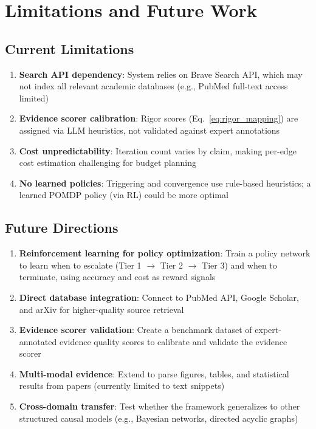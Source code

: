 \section{Limitations and Future Work}

\subsection{Current Limitations}

\begin{enumerate}
    \item \textbf{Search API dependency}: System relies on Brave Search API, which may not index all relevant academic databases (e.g., PubMed full-text access limited)
    
    \item \textbf{Evidence scorer calibration}: Rigor scores (Eq.~\ref{eq:rigor_mapping}) are assigned via LLM heuristics, not validated against expert annotations
    
    \item \textbf{Cost unpredictability}: Iteration count varies by claim, making per-edge cost estimation challenging for budget planning
    
    \item \textbf{No learned policies}: Triggering and convergence use rule-based heuristics; a learned POMDP policy (via RL) could be more optimal
\end{enumerate}

\subsection{Future Directions}

\begin{enumerate}
    \item \textbf{Reinforcement learning for policy optimization}: Train a policy network to learn when to escalate (Tier 1 $\to$ Tier 2 $\to$ Tier 3) and when to terminate, using accuracy and cost as reward signals
    
    \item \textbf{Direct database integration}: Connect to PubMed API, Google Scholar, and arXiv for higher-quality source retrieval
    
    \item \textbf{Evidence scorer validation}: Create a benchmark dataset of expert-annotated evidence quality scores to calibrate and validate the evidence scorer
    
    \item \textbf{Multi-modal evidence}: Extend to parse figures, tables, and statistical results from papers (currently limited to text snippets)
    
    \item \textbf{Cross-domain transfer}: Test whether the framework generalizes to other structured causal models (e.g., Bayesian networks, directed acyclic graphs)
\end{enumerate}

